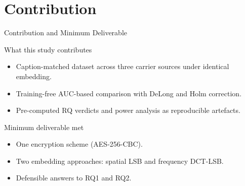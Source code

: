 \documentclass[aspectratio=169,11pt]{beamer}
\begin{document}
\section{Contribution}
\begin{frame}{Contribution and Minimum Deliverable}
\small
\begin{block}{What this study contributes}
\begin{itemize}
\item Caption-matched dataset across three carrier sources under identical embedding.
\item Training-free AUC-based comparison with DeLong and Holm correction.
\item Pre-computed RQ verdicts and power analysis as reproducible artefacts.
\end{itemize}
\end{block}
\begin{block}{Minimum deliverable met}
\begin{itemize}
\item One encryption scheme (AES-256-CBC). \checkmark
\item Two embedding approaches: spatial LSB and frequency DCT-LSB. \checkmark
\item Defensible answers to RQ1 and RQ2. \checkmark
\end{itemize}
\end{block}
\end{frame}
\end{document}
